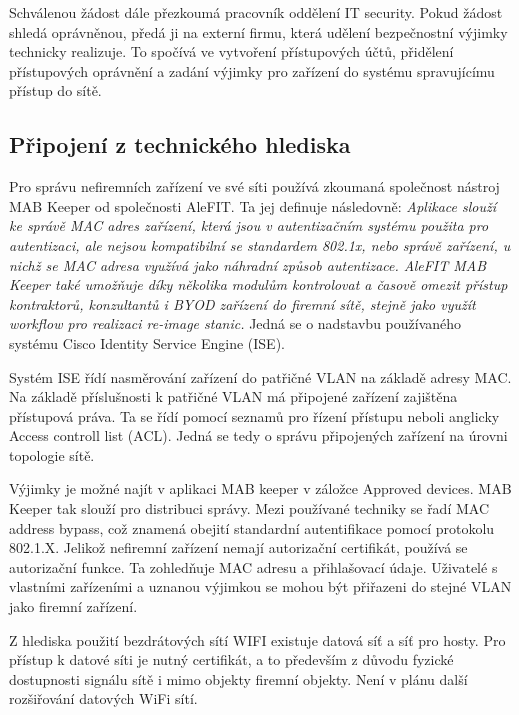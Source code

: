 Schválenou žádost dále přezkoumá pracovník oddělení IT security. Pokud žádost shledá oprávněnou, předá ji na externí firmu, která udělení bezpečnostní výjimky technicky realizuje. To spočívá ve vytvoření přístupových účtů, přidělení přístupových oprávnění a zadání výjimky pro zařízení do systému spravujícímu přístup do sítě. 

\subsection{Připojení z technického hlediska}

Pro správu nefiremních zařízení ve své síti používá zkoumaná společnost nástroj MAB Keeper od společnosti AleFIT. Ta jej definuje následovně: \textit{Aplikace slouží ke správě MAC adres zařízení, která jsou v autentizačním systému použita pro autentizaci, ale nejsou kompatibilní se standardem 802.1x, nebo správě zařízení, u nichž se MAC adresa využívá jako náhradní způsob autentizace. AleFIT MAB Keeper také umožňuje díky několika modulům kontrolovat a časově omezit přístup kontraktorů, konzultantů i BYOD zařízení do firemní sítě, stejně jako využít workflow pro realizaci re-image stanic.}  Jedná se o nadstavbu používaného systému Cisco Identity Service Engine (ISE).


Systém ISE řídí nasměrování zařízení do patřičné VLAN na základě adresy MAC. Na základě příslušnosti k patřičné VLAN má připojené zařízení zajištěna přístupová práva. Ta se řídí pomocí seznamů pro řízení přístupu neboli anglicky Access controll list (ACL). Jedná se tedy o správu připojených zařízení na úrovni topologie sítě. 

Výjimky je možné najít v aplikaci MAB keeper v záložce Approved devices. MAB Keeper tak slouží pro distribuci správy. Mezi používané techniky se řadí MAC address bypass, což znamená obejití standardní autentifikace pomocí protokolu 802.1.X. Jelikož nefiremní zařízení nemají autorizační certifikát, používá se autorizační funkce. Ta zohledňuje MAC adresu a přihlašovací údaje. Uživatelé s vlastními zařízeními a uznanou výjimkou se mohou být přiřazeni do stejné VLAN jako firemní zařízení.


Z hlediska použití bezdrátových sítí WIFI existuje datová síť a síť pro hosty. Pro přístup k datové síti je nutný certifikát, a to především z důvodu fyzické dostupnosti signálu sítě i mimo objekty firemní objekty. Není v plánu další rozšiřování datových WiFi sítí.  


